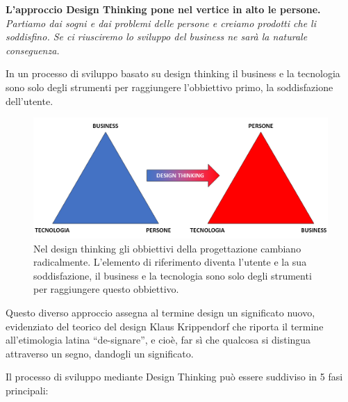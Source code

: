 \textbf{L’approccio Design Thinking pone nel vertice in alto le persone.}\\

\textit{Partiamo dai sogni e dai problemi delle persone e creiamo prodotti che li soddisfino. Se ci riusciremo lo sviluppo del business ne sarà la naturale conseguenza.} 

In un processo di sviluppo basato su design thinking il business e la tecnologia sono solo degli strumenti per raggiungere l'obbiettivo primo, la soddisfazione dell'utente.

\begin{figure}[!h]
	\centering
	\includegraphics[width=\textwidth]{../immagini/des_think.png}
	\caption{Nel design thinking gli obbiettivi della progettazione cambiano radicalmente. L'elemento di riferimento diventa l'utente e la sua soddisfazione, il business e la tecnologia sono solo degli strumenti per raggiungere questo obbiettivo.}
	\label{fig:dt_piramide}
\end{figure}

Questo diverso approccio assegna al termine design un significato nuovo, evidenziato del teorico del design Klaus Krippendorf che riporta il termine all’etimologia latina “de-signare”, e cioè, far sì che qualcosa si distingua attraverso un segno, dandogli un significato. 

Il processo di sviluppo mediante Design Thinking può essere suddiviso in 5 fasi principali:

